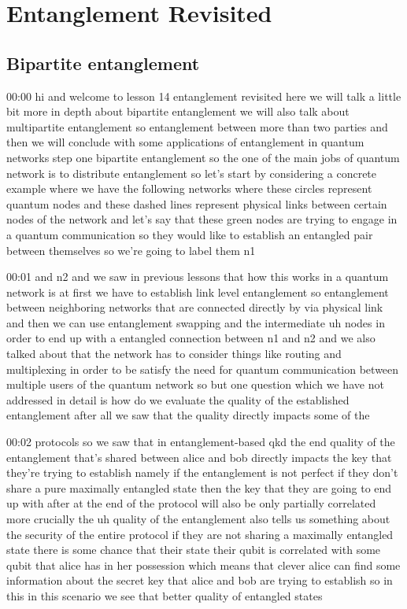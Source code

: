 \chapter{Entanglement Revisited}

\section{Bipartite entanglement}

00:00
hi and welcome to lesson 14 entanglement revisited here we will talk
a little bit more in depth about bipartite entanglement
we will also talk about multipartite entanglement so entanglement between
more than two parties and then we will conclude
with some applications of entanglement in quantum networks
step one bipartite entanglement so the one of the main jobs of quantum
network is to distribute entanglement so let's start by
considering a concrete example where we have the following networks
where these circles represent quantum nodes and these dashed lines represent
physical links between certain nodes of the network
and let's say that these green nodes are trying to engage
in a quantum communication so they would like to establish an entangled pair
between themselves so we're going to label them n1

00:01
and n2 and we saw in previous lessons that how this works in a quantum network
is at first we have to establish link level entanglement
so entanglement between neighboring networks that are connected directly by
via physical link and then we can use entanglement swapping and the intermediate
uh nodes in order to end up with a entangled connection between n1
and n2 and we also talked about that the network has to consider things
like routing and multiplexing in order to be satisfy
the need for quantum communication between multiple users of the quantum network
so but one question which we have not addressed in detail
is how do we evaluate the quality of the established
entanglement after all we saw that the quality directly impacts some of the

00:02
protocols so we saw that in entanglement-based qkd
the end quality of the entanglement that's shared between
alice and bob directly impacts the key that they're trying to
establish namely if the entanglement is not perfect
if they don't share a pure maximally entangled state
then the key that they are going to end up with after at the end of the protocol
will also be only partially correlated more crucially the uh
quality of the entanglement also tells us something about the security of the
entire protocol if they are not sharing a maximally
entangled state there is some chance that their state their qubit is
correlated with some qubit that alice has in her possession
which means that clever alice can find some information about the secret key
that alice and bob are trying to establish
so in this in this scenario we see that better quality of entangled states

